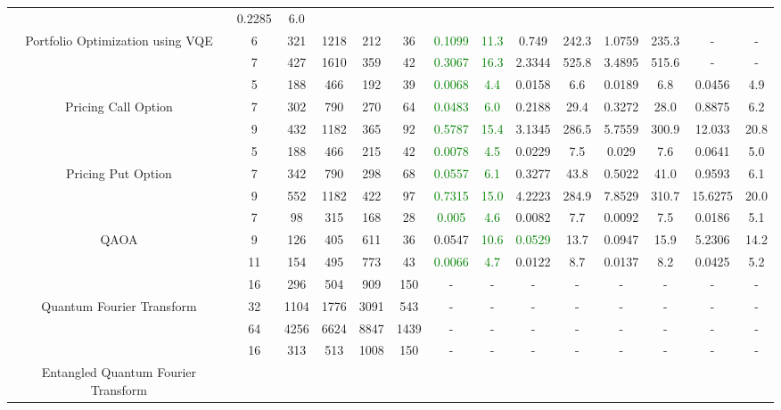 \begin{table}[htb]
{\begin{tabular}{|c|c|c|c|c|c|c|c|c|c|c|c|c|c|}
 & 0.2285 & 6.0
 \\
Portfolio Optimization using VQE & 
6 & 321 & 1218 & 212 & 36
 & \textcolor{green}{0.1099} & \textcolor{green}{11.3}
 & 0.749 & 242.3
 & 1.0759 & 235.3
 & - & -
 \\
 & 
7 & 427 & 1610 & 359 & 42
 & \textcolor{green}{0.3067} & \textcolor{green}{16.3}
 & 2.3344 & 525.8
 & 3.4895 & 515.6
 & - & -
 \\
\hline
 & 
5 & 188 & 466 & 192 & 39
 & \textcolor{green}{0.0068} & \textcolor{green}{4.4}
 & 0.0158 & 6.6
 & 0.0189 & 6.8
 & 0.0456 & 4.9
 \\
Pricing Call Option & 
7 & 302 & 790 & 270 & 64
 & \textcolor{green}{0.0483} & \textcolor{green}{6.0}
 & 0.2188 & 29.4
 & 0.3272 & 28.0
 & 0.8875 & 6.2
 \\
 & 
9 & 432 & 1182 & 365 & 92
 & \textcolor{green}{0.5787} & \textcolor{green}{15.4}
 & 3.1345 & 286.5
 & 5.7559 & 300.9
 & 12.033 & 20.8
 \\
\hline
 & 
5 & 188 & 466 & 215 & 42
 & \textcolor{green}{0.0078} & \textcolor{green}{4.5}
 & 0.0229 & 7.5
 & 0.029 & 7.6
 & 0.0641 & 5.0
 \\
Pricing Put Option & 
7 & 342 & 790 & 298 & 68
 & \textcolor{green}{0.0557} & \textcolor{green}{6.1}
 & 0.3277 & 43.8
 & 0.5022 & 41.0
 & 0.9593 & 6.1
 \\
 & 
9 & 552 & 1182 & 422 & 97
 & \textcolor{green}{0.7315} & \textcolor{green}{15.0}
 & 4.2223 & 284.9
 & 7.8529 & 310.7
 & 15.6275 & 20.0
 \\
\hline
 & 
7 & 98 & 315 & 168 & 28
 & \textcolor{green}{0.005} & \textcolor{green}{4.6}
 & 0.0082 & 7.7
 & 0.0092 & 7.5
 & 0.0186 & 5.1
 \\
QAOA & 
9 & 126 & 405 & 611 & 36
 & 0.0547 & \textcolor{green}{10.6}
 & \textcolor{green}{0.0529} & 13.7
 & 0.0947 & 15.9
 & 5.2306 & 14.2
 \\
 & 
11 & 154 & 495 & 773 & 43
 & \textcolor{green}{0.0066} & \textcolor{green}{4.7}
 & 0.0122 & 8.7
 & 0.0137 & 8.2
 & 0.0425 & 5.2
 \\
\hline
 & 
16 & 296 & 504 & 909 & 150
 & - & -
 & - & -
 & - & -
 & - & -
 \\
Quantum Fourier Transform & 
32 & 1104 & 1776 & 3091 & 543
 & - & -
 & - & -
 & - & -
 & - & -
 \\
 & 
64 & 4256 & 6624 & 8847 & 1439
 & - & -
 & - & -
 & - & -
 & - & -
 \\
\hline
 & 
16 & 313 & 513 & 1008 & 150
 & - & -
 & - & -
 & - & -
 & - & -
 \\
Entangled Quantum Fourier Transform & 

\end{tabular}}
\end{table}
